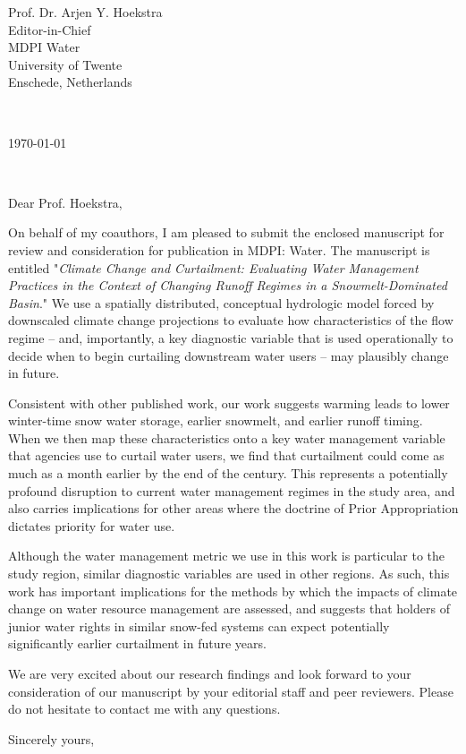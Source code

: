 \documentclass[10pt,letterpaper]{letter} %
\def\opening#1{\thispagestyle{empty}
{\centering\fromaddress \vspace{0.1in} \\ %
\begin{flushright}\today\end{flushright}} %
{\raggedright \toname \\ \toaddress \par} %
\vspace{0.1in} %
\noindent #1 %
}
\begin{document}

\begin{letter}
{Prof. Dr. Arjen Y. Hoekstra\\
Editor-in-Chief\\
MDPI Water\\
University of Twente\\
Enschede, Netherlands\\
}


\opening{Dear Prof. Hoekstra,}

On behalf of my coauthors, I am pleased to submit the enclosed manuscript for review and consideration for publication in MDPI: Water. The manuscript is entitled "\textit{Climate Change and Curtailment: Evaluating Water Management Practices in the Context of Changing Runoff Regimes in a Snowmelt-Dominated Basin}." We use a spatially distributed, conceptual hydrologic model forced by downscaled climate change projections to evaluate how characteristics of the flow regime -- and, importantly, a key diagnostic variable that is used operationally to decide when to begin curtailing downstream water users -- may plausibly change in future.

Consistent with other published work, our work suggests warming leads to lower winter-time snow water storage, earlier snowmelt, and earlier runoff timing. When we then map these characteristics onto a key water management variable that agencies use to curtail water users, we find that curtailment could come as much as a month earlier by the end of the century. This represents a potentially profound disruption to current water management regimes in the study area, and also carries implications for other areas where the doctrine of Prior Appropriation dictates priority for water use. 

Although the  water management metric we use in this work is particular to the study region, similar diagnostic variables are used in other regions. As such, this work has important implications for the methods by which the impacts of climate change on water resource management are assessed, and suggests that holders of junior water rights in similar snow-fed systems can expect potentially significantly earlier curtailment in future years.  

We are very excited about our research findings and look forward to your consideration of our manuscript by your editorial staff and peer reviewers. Please do not hesitate to contact me with any questions.

\closing{Sincerely yours,}


\end{letter}
\end{document}
